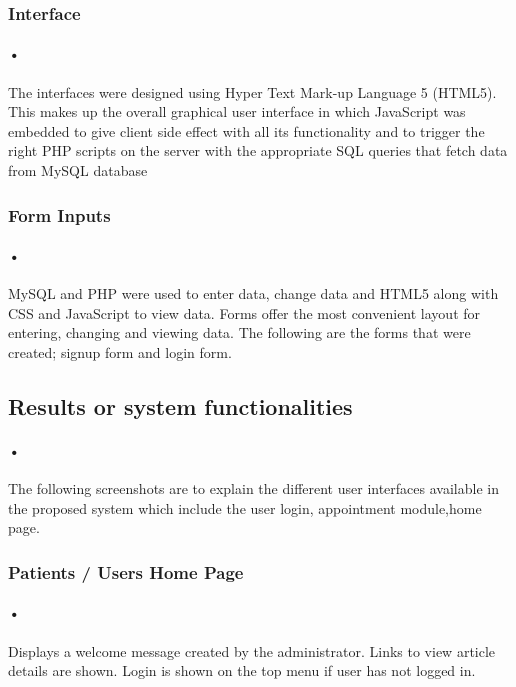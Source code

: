 \documentclass[12pt]{article}
\begin{document}
\subsubsection{Interface} 
\paragraph{•}The interfaces were designed using Hyper Text Mark-up Language 5 (HTML5). This makes up the overall graphical user interface in which JavaScript was embedded to give client side effect with all its functionality and to trigger the right PHP scripts on the server with the appropriate SQL queries that fetch data from MySQL database

\subsubsection{Form Inputs} 
\paragraph{•}MySQL and PHP were used to enter data, change data and HTML5 along with CSS and JavaScript to view data. Forms offer the most convenient layout for entering, changing and viewing data. The following are the forms that were created; signup form and login form.

\subsection{Results or system functionalities}
\paragraph{•}The following screenshots are to explain the different user interfaces available in the proposed system which include the user login, appointment module,home page.


\subsubsection{Patients / Users Home Page} 
\paragraph{•}Displays a welcome message created by the administrator. Links to view article details are shown. Login is shown on the top menu if user has not logged in.
\end{document}
